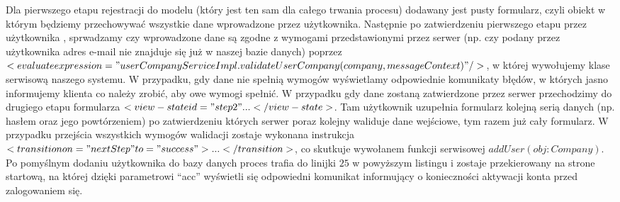 \documentclass[a4paper]{article}
\begin{document}
Dla pierwszego etapu rejestracji do modelu (który jest ten sam dla całego trwania procesu) dodawany jest pusty formularz, czyli obiekt w którym będziemy przechowywać wszystkie dane wprowadzone przez użytkownika. Następnie po zatwierdzeniu pierwszego etapu przez użytkownika , sprwadzamy czy wprowadzone dane są zgodne z wymogami przedstawionymi przez serwer (np. czy podany przez użytkownika adres e-mail nie znajduje się już w naszej bazie danych) poprzez $<evaluate expression="userCompanyServiceImpl.validateUserCompany(company,messageContext)" />$,  w której wywołujemy klase serwisową naszego systemu. W przypadku, gdy dane nie spełnią wymogów wyświetlamy odpowiednie komunikaty błędów, w których jasno informujemy klienta co należy zrobić, aby owe wymogi spełnić. W przypadku gdy dane zostaną zatwierdzone przez serwer przechodzimy do drugiego etapu formularza  $<view-state id="step2" ... </view-state>$. Tam użytkownik uzupełnia formularz kolejną serią danych (np. hasłem oraz jego powtórzeniem) po zatwierdzeniu których serwer poraz kolejny waliduje dane wejściowe, tym razem już cały formularz. W przypadku przejścia wszystkich wymogów walidacji zostaje wykonana instrukcja $<transition on="nextStep" to="success">...</transition>$, co skutkuje wywołanem funkcji serwisowej $addUser(obj: Company)$. Po pomyślnym dodaniu użytkownika do bazy danych proces trafia do linijki $25$ w powyższym listingu i zostaje przekierowany na strone startową, na której dzięki parametrowi ``acc'' wyświetli się odpowiedni komunikat informujący o konieczności aktywacji konta przed zalogowaniem się.
\end{document}

